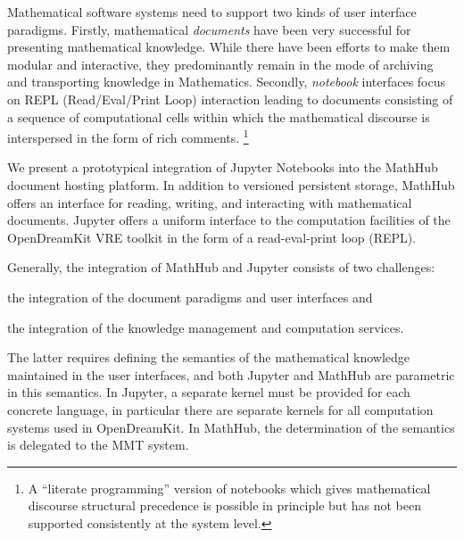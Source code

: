 
Mathematical software systems need to support two kinds of user interface paradigms.
Firstly, mathematical \emph{documents} have been very successful for presenting mathematical knowledge.
While there have been efforts to make them modular and interactive, they predominantly remain in the mode of archiving and transporting knowledge in Mathematics.
Secondly, \emph{notebook} interfaces focus on REPL (Read/Eval/Print Loop) interaction leading to documents consisting of a sequence of computational cells within which the mathematical discourse is interspersed in the form of rich comments.
\footnote {A ``literate programming'' version of notebooks which gives mathematical discourse structural precedence is possible in principle but has not been supported consistently at the system level.}

We present a prototypical integration of Jupyter Notebooks into the MathHub document hosting platform.
In addition to versioned persistent storage, MathHub offers an interface for reading, writing, and interacting with mathematical documents.
Jupyter offers a uniform interface to the computation facilities of the OpenDreamKit VRE toolkit in the form of a read-eval-print loop (REPL).

Generally, the integration of MathHub and Jupyter consists of two challenges:
\begin{inparaenum}[\em a\rm )]
\item the integration of the document paradigms and user interfaces and
\item the integration of the knowledge management and computation services.
\end{inparaenum}
The latter requires defining the semantics of the mathematical knowledge maintained in the user interfaces, and both Jupyter and MathHub are parametric in this semantics.
In Jupyter, a separate kernel must be provided for each concrete language, in particular there are separate kernels for all computation systems used in OpenDreamKit.
In MathHub, the determination of the semantics is delegated to the MMT system.

